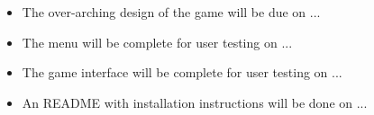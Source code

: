 \begin{itemize}
    \item The over-arching design of the game will be due on ...
    \item The menu will be complete for user testing on ...
    \item The game interface will be complete for user testing on ...
    \item An README with installation instructions will be done on ...
\end{itemize}
